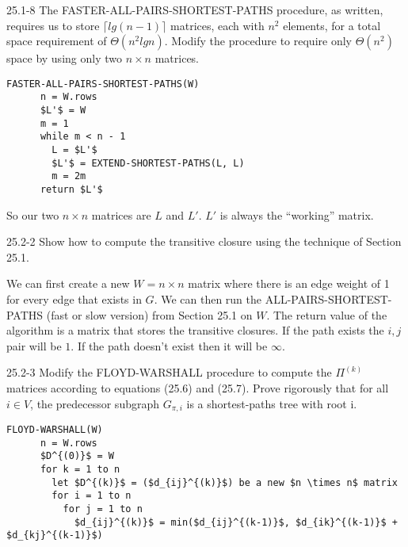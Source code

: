 




\homeworkheader{\classnameandsection}

\begin{problem}{25.1-8}
  The FASTER-ALL-PAIRS-SHORTEST-PATHS procedure, as written, requires us to store $\lceil lg(n-1) \rceil$ matrices,
  each with $n^2$ elements, for a total space requirement of $\Theta(n^2 lg n)$. Modify the procedure to require only
  $\Theta(n^2)$ space by using only two $n \times n$ matrices.
  \begin{solution}
    \begin{lstlisting}[mathescape]
    FASTER-ALL-PAIRS-SHORTEST-PATHS(W)
      n = W.rows
      $L'$ = W
      m = 1
      while m < n - 1
        L = $L'$
        $L'$ = EXTEND-SHORTEST-PATHS(L, L)
        m = 2m
      return $L'$
    \end{lstlisting}
    
    \noindent So our two $n \times n$ matrices are $L$ and $L'$.  $L'$ is always the ``working'' matrix.
  \end{solution}
\end{problem}

\begin{problem}{25.2-2}
  Show how to compute the transitive closure using the technique of Section 25.1.
  \begin{solution}
    We can first create a new $ W = n \times n$ matrix where there is an edge weight of 1 for every edge that exists in
    $G$. We can then run the ALL-PAIRS-SHORTEST-PATHS (fast or slow version) from Section 25.1 on $W$. The return value
    of the algorithm is a matrix that stores the transitive closures.  If the path exists the $i,j$ pair will be $1$.
    If the path doesn't exist then it will be $\infty$.
  \end{solution}
\end{problem}

\begin{problem}{25.2-3}
  Modify the FLOYD-WARSHALL procedure to compute the $\Pi^{(k)}$ matrices according to equations (25.6) and (25.7).
  Prove rigorously that for all $i \in V$, the predecessor subgraph $G_{\pi,i}$ is a shortest-paths tree with root i.
  \begin{solution}
    \begin{lstlisting}[mathescape]
      FLOYD-WARSHALL(W)
      n = W.rows
      $D^{(0)}$ = W
      for k = 1 to n
        let $D^{(k)}$ = ($d_{ij}^{(k)}$) be a new $n \times n$ matrix
        for i = 1 to n
          for j = 1 to n
            $d_{ij}^{(k)}$ = min($d_{ij}^{(k-1)}$, $d_{ik}^{(k-1)}$ + $d_{kj}^{(k-1)}$)
    \end{lstlisting}
  \end{solution}
\end{problem}

